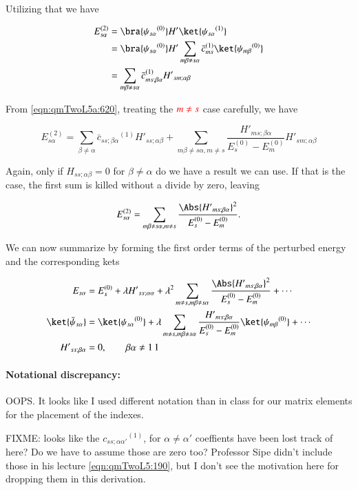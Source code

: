 Utilizing that we have

\begin{align*}
E_{s \alpha}^{(2)} 
&=
\bra{{\psi_{s \alpha}}^{(0)}} H' \ket{{\psi_{s \alpha}}^{(1)}}  \\
&=
\bra{{\psi_{s \alpha}}^{(0)}} H' \sum_{m \beta \ne s \alpha} {\bar{c}_{ms}}^{(1)} \ket{{\psi_{m \beta}}^{(0)}} \\
&=
\sum_{m \beta \ne s \alpha} {\bar{c}_{ms ; \beta \alpha}}^{(1)} {H'}_{sm ; \alpha \beta}
\end{align*}

From \ref{eqn:qmTwoL5a:620}, treating the $\color{red}{m \ne s}$ case carefully, we have

\begin{equation}\label{eqn:qmTwoL5a:700}
E_{s \alpha}^{(2)} 
=
\sum_{\beta \ne \alpha} {\bar{c}_{ss ; \beta \alpha}}^{(1)} {H'}_{ss ; \alpha \beta}
+
\sum_{m \beta \ne s \alpha, m \ne s} 
\frac{{H'}_{ms ; \beta \alpha} }
{ E_s^{(0)} - E_m^{(0)} }
{H'}_{sm ; \alpha \beta}
\end{equation}

Again, only if $H_{ss ; \alpha \beta} = 0$ for $\beta \ne \alpha$ do we have a result we can use.  If that is the case, the first sum is killed without a divide by zero, leaving

\begin{equation}\label{eqn:qmTwoL5a:700b}
E_{s \alpha}^{(2)} 
=
\sum_{m \beta \ne s \alpha, m \ne s} 
\frac{\Abs{{H'}_{ms ; \beta \alpha}}^2 }
{ E_s^{(0)} - E_m^{(0)} }.
\end{equation}

We can now summarize by forming the first order terms of the perturbed energy and the corresponding kets

\begin{align}\label{eqn:qmTwoL5a:720}
E_{s \alpha} &= E_s^{(0)} + \lambda {H'}_{ss ; \alpha \alpha} + \lambda^2 
\sum_{m \ne s, m \beta \ne s \alpha} 
\frac{\Abs{{H'}_{ms ; \beta \alpha}}^2 }
{ E_s^{(0)} - E_m^{(0)} } 
+ \cdots
\\
\ket{\bar{\psi}_{s \alpha}} &= \ket{{\psi_{s \alpha}}^{(0)}} + \lambda
\sum_{m \ne s, m \beta \ne s \alpha} 
\frac{{H'}_{ms ; \beta \alpha}}
{ E_s^{(0)} - E_m^{(0)} } \ket{{\psi_{m \beta}}^{(0)}}
+ \cdots \\
{H'}_{ss ; \beta \alpha} &= 0, \qquad \beta \alpha \ne 1\,1
\end{align}

\paragraph{Notational discrepancy:} OOPS.  It looks like I used different notation than in class for our matrix elements for the placement of the indexes.

FIXME: looks like the ${c_{ss ; \alpha \alpha'}}^{(1)}$, for $\alpha \ne \alpha'$ coeffients have been lost track of here?  Do we have to assume those are zero too?  Professor Sipe didn't include those in his lecture \ref{eqn:qmTwoL5:190}, but I don't see the motivation here for dropping them in this derivation.

